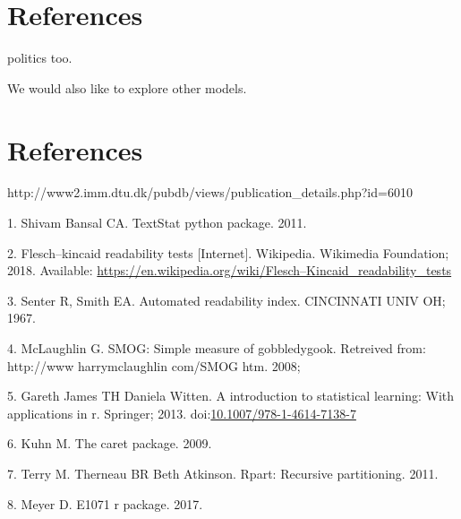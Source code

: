 \documentclass[10pt,letterpaper]{article}
\begin{document}
\section*{References}\label{references}
politics too.

We would also like to explore other models.

\hypertarget{references}{%
\section*{References}\label{references}}

http://www2.imm.dtu.dk/pubdb/views/publication\_details.php?id=6010

\hypertarget{refs}{}
\leavevmode\hypertarget{ref-textstat}{}%
1. Shivam Bansal CA. TextStat python package. 2011.

\leavevmode\hypertarget{ref-wikipedia_2018}{}%
2. Flesch--kincaid readability tests {[}Internet{]}. Wikipedia.
Wikimedia Foundation; 2018. Available:
\url{https://en.wikipedia.org/wiki/Flesch–Kincaid_readability_tests}

\leavevmode\hypertarget{ref-senter1967automated}{}%
3. Senter R, Smith EA. Automated readability index. CINCINNATI UNIV OH;
1967.

\leavevmode\hypertarget{ref-mclaughlin2008smog}{}%
4. McLaughlin G. SMOG: Simple measure of gobbledygook. Retreived from:
http://www harrymclaughlin com/SMOG htm. 2008;

\leavevmode\hypertarget{ref-MLbook}{}%
5. Gareth James TH Daniela Witten. A introduction to statistical
learning: With applications in r. Springer; 2013.
doi:\href{https://doi.org/10.1007/978-1-4614-7138-7}{10.1007/978-1-4614-7138-7}

\leavevmode\hypertarget{ref-Kuhn09thecaret}{}%
6. Kuhn M. The caret package. 2009.

\leavevmode\hypertarget{ref-rpart}{}%
7. Terry M. Therneau BR Beth Atkinson. Rpart: Recursive partitioning.
2011.

\leavevmode\hypertarget{ref-e1071}{}%
8. Meyer D. E1071 r package. 2017.

\nolinenumbers
\end{document}
